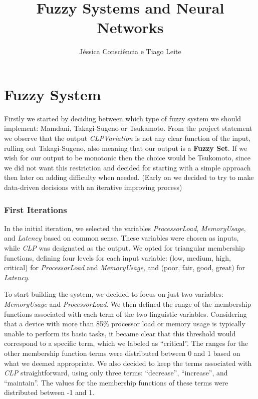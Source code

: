 \documentclass[11pt]{report}
\title{Fuzzy Systems and Neural Networks}
\author{Jéssica Consciência e Tiago Leite}
\begin{document}
\maketitle
\newpage

\part{Fuzzy System}

Firstly we started by deciding between which type of fuzzy system
we should implement: Mamdani, Takagi-Sugeno or Tsukamoto. From the
project statement we observe that the output \textit{CLPVariation}
is not any clear function of the input, rulling out Takagi-Sugeno,
also meaning that our output is a \textbf{Fuzzy Set}. If we wish for
our output to be monotonic then the choice would be Tsukomoto, since
we did not want this restriction and decided for starting with a simple
approach then later on adding difficulty when needed.
(Early on we decided to try to make data-driven decisions with an iterative
improving process)

\section{First Iterations}

In the initial iteration, we selected the variables \textit{ProcessorLoad}, \textit{MemoryUsage}, and \textit{Latency} based on common sense.
These variables were chosen as inputs, while \textit{CLP} was designated as the output.
We opted for triangular membership functions, defining four levels for each input variable: (low, medium, high, critical) for \textit{ProcessorLoad} and \textit{MemoryUsage}, and (poor, fair, good, great) for \textit{Latency}.

To start building the system, we decided to focus on just two variables: \textit{MemoryUsage} and \textit{ProcessorLoad}.
We then defined the range of the membership functions associated with each term of the two linguistic variables.
Considering that a device with more than 85\% processor load or memory usage is typically unable to perform its basic tasks,
it became clear that this threshold would correspond to a specific term, which we labeled as ``critical''. The ranges for the other membership function terms were distributed between 0 and 1 based on what we deemed appropriate.
We also decided to keep the terms associated with \textit{CLP} straightforward, using only three terms: ``decrease'', ``increase'', and ``maintain''.
The values for the membership functions of these terms were distributed between -1 and 1.
\end{document}
